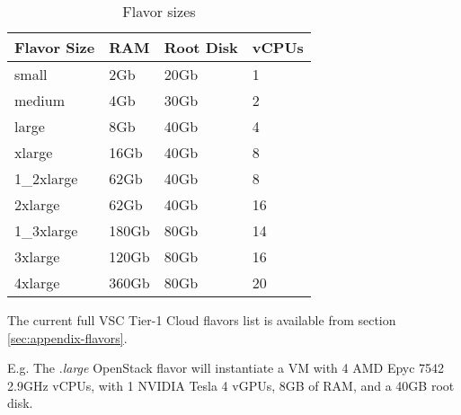 \begin{table}[h!]
\centering
\begin{tabular}{ |p{3cm}|p{3cm}|p{3cm}|p{3cm}| }
  \hline
  \rowcolor{lightgray} \textbf{Flavor Size} & \textbf{RAM} & \textbf{Root Disk} & \textbf{vCPUs} \\
  \hline
  small & 2Gb & 20Gb & 1 \\
  \hline
  medium & 4Gb & 30Gb & 2 \\
  \hline
  large & 8Gb & 40Gb & 4 \\
  \hline
  xlarge & 16Gb & 40Gb & 8 \\
  \hline
  1\_2xlarge & 62Gb & 40Gb & 8 \\
  \hline
  2xlarge & 62Gb & 40Gb & 16 \\
  \hline
  1\_3xlarge & 180Gb & 80Gb & 14 \\
  \hline
  3xlarge & 120Gb & 80Gb & 16 \\
  \hline
  4xlarge & 360Gb & 80Gb & 20 \\
  \hline
\end{tabular}
\caption{Flavor sizes}
\label{table:flavor-size}
\end{table}

The current full VSC Tier-1 Cloud flavors list is available from section \ref{sec:appendix-flavors}.

E.g. The .\emph{large} OpenStack flavor will instantiate a
VM with 4 AMD Epyc 7542 2.9GHz vCPUs, with 1 NVIDIA Tesla 4 vGPUs, 8GB
of RAM, and a 40GB root disk.


